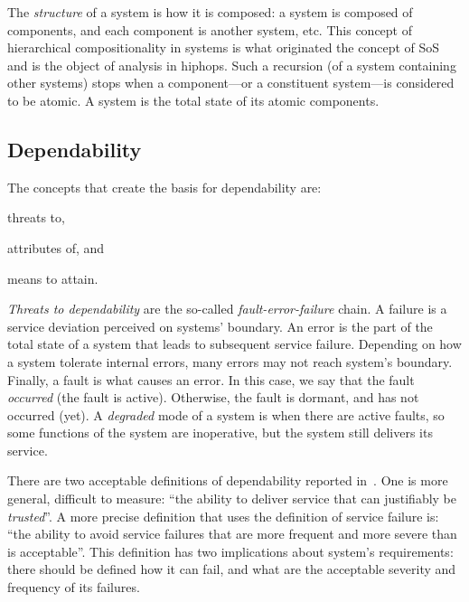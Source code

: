 \documentclass[12pt,openright,twoside,a4paper,oldfontcommands,english,brazil,final]{abntex2}
\theoremstyle{theo}
\begin{document}
The \emph{structure} of a system is how it is composed: a system is composed of components, and each component is another system, etc.
This concept of hierarchical compositionality in systems is what originated the concept of \ac{SoS} and is the object of analysis in \ac{hiphops}.
Such a recursion (of a system containing other systems) stops when a component---or a constituent system---is considered to be atomic.
A system is the total state of its atomic components.

\subsection{Dependability}

The concepts that create the basis for dependability are:
\begin{alineasinline}
  \item threats to,
  \item attributes of, and
  \item means to attain.
\end{alineasinline}

\emph{Threats to dependability} are the so-called \emph{fault-error-failure} chain.
A failure is a service deviation perceived on systems' boundary.
An error is the part of the total state of a system that leads to subsequent service failure.
Depending on how a system tolerate internal errors, many errors may not reach system's boundary.
Finally, a fault is what causes an error.
In this case, we say that the fault \emph{occurred} (the fault is active).
Otherwise, the fault is dormant, and has not occurred (yet).
A \emph{degraded} mode of a system is when there are active faults, so some functions of the system are inoperative, but the system still delivers its service.

There are two acceptable definitions of dependability reported in~\cite{ALR+2004}.
One is more general, difficult to measure: ``the ability to deliver service that can justifiably be \emph{trusted}''.
A more precise definition that uses the definition of service failure is: ``the ability to avoid service failures that are more frequent and more severe than is acceptable''.
This definition has two implications about system's requirements: there should be defined how it can fail, and what are the acceptable severity and frequency of its failures.
\end{document}

